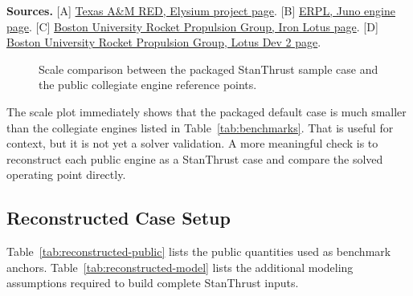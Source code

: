 \documentclass[11pt]{article}
\begin{document}
\noindent\textbf{Sources.}
[A] \href{https://www.tamured.space/projects/elysium}{Texas A\&M RED, Elysium project page}.
[B] \href{https://erpl.space/juno/}{ERPL, Juno engine page}.
[C] \href{https://burpg.org/iron-lotus}{Boston University Rocket Propulsion Group, Iron Lotus page}.
[D] \href{https://burpg.org/lotus-dev-2}{Boston University Rocket Propulsion Group, Lotus Dev 2 page}.

\begin{figure}[H]
\centering
{}
\caption{Scale comparison between the packaged StanThrust sample case and the public collegiate engine reference points.}
\end{figure}

The scale plot immediately shows that the packaged default case is much smaller than the collegiate engines listed in Table~\ref{tab:benchmarks}. That is useful for context, but it is not yet a solver validation. A more meaningful check is to reconstruct each public engine as a StanThrust case and compare the solved operating point directly.

\subsection*{Reconstructed Case Setup}
Table~\ref{tab:reconstructed-public} lists the public quantities used as benchmark anchors. Table~\ref{tab:reconstructed-model} lists the additional modeling assumptions required to build complete StanThrust inputs.
\end{document}
